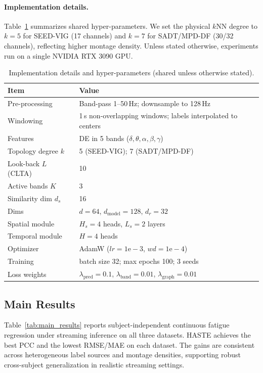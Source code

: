 \documentclass[preprint,12pt]{elsarticle}
\begin{document}
\paragraph{Implementation details.}
Table~\ref{tab:hyperparams} summarizes shared hyper-parameters.
We set the physical $k$NN degree to $k{=}5$ for SEED-VIG (17 channels) and $k{=}7$ for SADT/MPD-DF (30/32 channels),
reflecting higher montage density.
Unless stated otherwise, experiments run on a single NVIDIA RTX 3090 GPU.

\begin{table}[!t]
\centering
\caption{Implementation details and hyper-parameters (shared unless otherwise stated).}
\label{tab:hyperparams}
\renewcommand{\arraystretch}{1.10}
\setlength{\tabcolsep}{6pt}
\begin{tabular}{ll}
\toprule
\textbf{Item} & \textbf{Value} \\
\midrule
Pre-processing & Band-pass 1--50\,Hz; downsample to 128\,Hz \\
Windowing & 1\,s non-overlapping windows; labels interpolated to centers \\
Features & DE in 5 bands ($\delta,\theta,\alpha,\beta,\gamma$) \\
Topology degree $k$ & 5 (SEED-VIG); 7 (SADT/MPD-DF) \\
Look-back $L$ (CLTA) & 10 \\
Active bands $K$ & 3 \\
Similarity dim $d_s$ & 16 \\
Dims & $d{=}64$, $d_{\mathrm{model}}{=}128$, $d_r{=}32$ \\
Spatial module & $H_s{=}4$ heads, $L_s{=}2$ layers \\
Temporal module & $H{=}4$ heads \\
Optimizer & AdamW ($lr{=}1\mathrm{e}{-}3$, $wd{=}1\mathrm{e}{-}4$) \\
Training & batch size 32; max epochs 100; 3 seeds \\
Loss weights & $\lambda_{\mathrm{pred}}{=}0.1$, $\lambda_{\mathrm{band}}{=}0.01$, $\lambda_{\mathrm{graph}}{=}0.01$ \\
\bottomrule
\end{tabular}
\end{table}

\subsection{Main Results}
\label{sec:exp_main}

Table~\ref{tab:main_results} reports subject-independent continuous fatigue regression under streaming inference on all three datasets.
HASTE achieves the best PCC and the lowest RMSE/MAE on each dataset.
The gains are consistent across heterogeneous label sources and montage densities, supporting robust cross-subject generalization
in realistic streaming settings.
\end{document}
